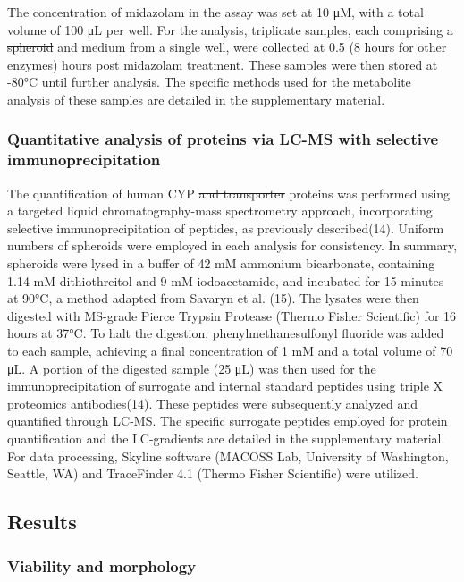 \documentclass[
  letterpaper,
  DIV=11,
  numbers=noendperiod,
  oneside]{scrartcl}
\begin{document}
The concentration of midazolam in the assay was set at 10 μM, with a
total volume of 100 μL per well. For the analysis, triplicate samples,
each comprising a \st{spheroid} and medium from a single well, were
collected at 0.5 (8 hours for other enzymes) hours post midazolam
treatment. These samples were then stored at -80°C until further
analysis. The specific methods used for the metabolite analysis of these
samples are detailed in the supplementary material.

\subsubsection{Quantitative analysis of proteins via LC-MS with
selective
immunoprecipitation}\label{quantitative-analysis-of-proteins-via-lc-ms-with-selective-immunoprecipitation}

The quantification of human CYP \st{and transporter} proteins was
performed using a targeted liquid chromatography-mass spectrometry
approach, incorporating selective immunoprecipitation of peptides, as
previously described(14). Uniform numbers of spheroids were employed in
each analysis for consistency. In summary, spheroids were lysed in a
buffer of 42 mM ammonium bicarbonate, containing 1.14 mM dithiothreitol
and 9 mM iodoacetamide, and incubated for 15 minutes at 90°C, a method
adapted from Savaryn et al. (15). The lysates were then digested with
MS-grade Pierce Trypsin Protease (Thermo Fisher Scientific) for 16 hours
at 37°C. To halt the digestion, phenylmethanesulfonyl fluoride was added
to each sample, achieving a final concentration of 1 mM and a total
volume of 70 μL. A portion of the digested sample (25 μL) was then used
for the immunoprecipitation of surrogate and internal standard peptides
using triple X proteomics antibodies(14). These peptides were
subsequently analyzed and quantified through LC-MS. The specific
surrogate peptides employed for protein quantification and the
LC-gradients are detailed in the supplementary material. For data
processing, Skyline software (MACOSS Lab, University of Washington,
Seattle, WA) and TraceFinder 4.1 (Thermo Fisher Scientific) were
utilized.

\subsection{Results}\label{results}

\subsubsection{Viability and morphology}\label{viability-and-morphology}
\end{document}
